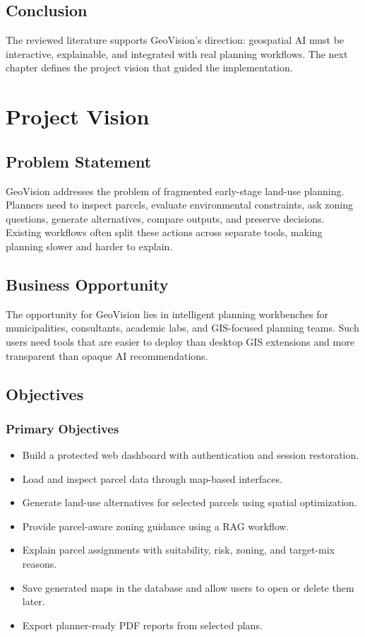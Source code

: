 \documentclass[12pt,a4paper,oneside]{report}
\begin{document}
\section{Conclusion}
The reviewed literature supports GeoVision's direction: geospatial AI must be interactive, explainable, and integrated with real planning workflows. The next chapter defines the project vision that guided the implementation.

\chapter{Project Vision}
\section{Problem Statement}
GeoVision addresses the problem of fragmented early-stage land-use planning. Planners need to inspect parcels, evaluate environmental constraints, ask zoning questions, generate alternatives, compare outputs, and preserve decisions. Existing workflows often split these actions across separate tools, making planning slower and harder to explain.

\section{Business Opportunity}
The opportunity for GeoVision lies in intelligent planning workbenches for municipalities, consultants, academic labs, and GIS-focused planning teams. Such users need tools that are easier to deploy than desktop GIS extensions and more transparent than opaque AI recommendations.

\section{Objectives}
\subsection{Primary Objectives}
\begin{itemize}
  \item Build a protected web dashboard with authentication and session restoration.
  \item Load and inspect parcel data through map-based interfaces.
  \item Generate land-use alternatives for selected parcels using spatial optimization.
  \item Provide parcel-aware zoning guidance using a RAG workflow.
  \item Explain parcel assignments with suitability, risk, zoning, and target-mix reasons.
  \item Save generated maps in the database and allow users to open or delete them later.
  \item Export planner-ready PDF reports from selected plans.
\end{itemize}
\end{document}
